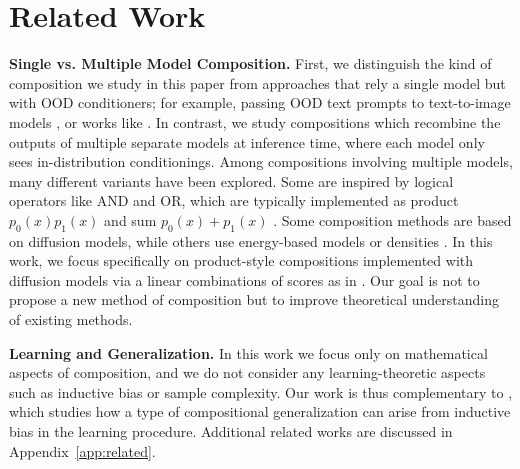 \section{Related Work}
\label{sec:related_work}

\textbf{Single vs. Multiple Model Composition.}
First, we distinguish the kind of composition we study in this paper from 
approaches that rely a single model 
but with OOD conditioners;
for example, passing OOD text prompts to text-to-image models \citep{nichol2021glide, podell2023sdxl},
or works like \citet{okawa2024compositional, park2024emergence}.
In contrast, we study compositions which recombine the outputs of
multiple separate models at inference time, where each model only sees
in-distribution conditionings.
Among compositions involving multiple models,
many different variants have been explored. %
Some are inspired by logical operators like AND and OR,
which are typically implemented as
product $p_0(x)p_1(x)$ and sum $p_0(x) + p_1(x)$ \citep{du2023reduce,du2024compositional,liu2022compositional}.
Some composition methods are based on diffusion models, 
while others use energy-based models \citep{du2020visualenergy, du2023reduce, liu2021learning} or densities \cite{skreta2024superposition}. In this work, we focus specifically on product-style compositions %
implemented with diffusion models via a linear combinations of scores as in \citet{du2023reduce, liu2022compositional}. Our goal is not to propose
a new method of composition but to improve theoretical understanding of existing methods.

\textbf{Learning and Generalization.}
In this work we focus only on mathematical aspects
of composition,
and we do not consider any learning-theoretic aspects
such as inductive bias or sample complexity.
Our work is thus complementary to \citet{kamb2024analytic},
which studies how a type of compositional generalization
can arise from inductive bias in the learning procedure.
Additional related works are discussed in Appendix~\ref{app:related}.
